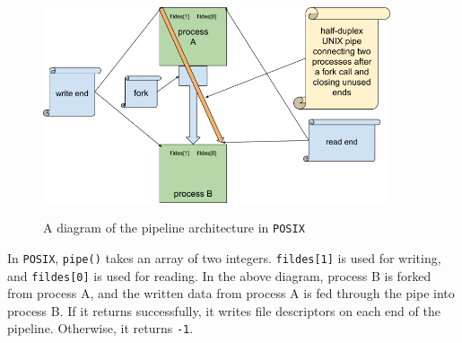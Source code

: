 \documentclass[12pt, dvipsnames, a4paper]{article}
\newcommand{\code}[1]{\texttt{#1}}
\begin{document}
\begin{figure}[!htb]
	\centering
	\includegraphics[width=290pt]{assets/localipc2.png}
	\caption{A diagram of the pipeline architecture in \code{POSIX}} \cite{rytarowski}
\end{figure}

In \code{POSIX}, \code{pipe()} takes an array of two integers. \code{fildes[1]} is used for writing, and \code{fildes[0]} is used for reading. In the above diagram, process B is forked from process A, and the written data from process A is fed through the pipe into process B. If it returns successfully, it writes file descriptors on each end of the pipeline. Otherwise, it returns \code{-1}.

\clearpage
\end{document}
